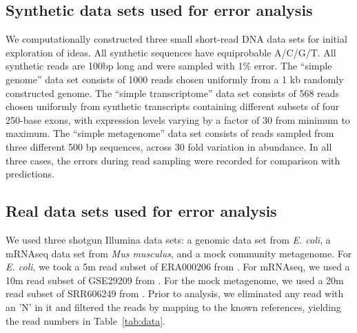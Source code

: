 \subsection{Synthetic data sets used for error analysis}

We computationally constructed three small short-read DNA data sets for initial
exploration of ideas.  All synthetic sequences have equiprobable A/C/G/T.  All
synthetic reads are 100bp long and were sampled with 1\% error.  The ``simple
genome'' data set consists of 1000 reads chosen uniformly from a 1 kb randomly
constructed genome. The ``simple transcriptome'' data set consists of 568 reads
chosen uniformly from synthetic transcripts containing different subsets of
four 250-base exons, with expression levels varying by a factor of 30 from
minimum to maximum.  The ``simple metagenome'' data set consists of reads
sampled from three different 500 bp sequences, across 30 fold variation in
abundance.  In all three cases, the errors during read sampling were recorded
for comparison with predictions.

\subsection{Real data sets used for error analysis}

We used three shotgun Illumina data sets: a genomic data set from {\em E.
coli}, a mRNAseq data set from {\em Mus musculus}, and a mock community
metagenome.  For {\em E. coli}, we took a 5m read subset of ERA000206 from
\cite{chitsaz}.  For mRNAseq, we used a 10m read subset of GSE29209 from
\cite{trinityrna}.  For the mock metagenome, we used a 20m read subset of
SRR606249 from \cite{podar}.  Prior to analysis, we eliminated any read with an
'N' in it and filtered the reads by mapping to the known references, yielding
the read numbers in Table~\ref{tab:data}.

